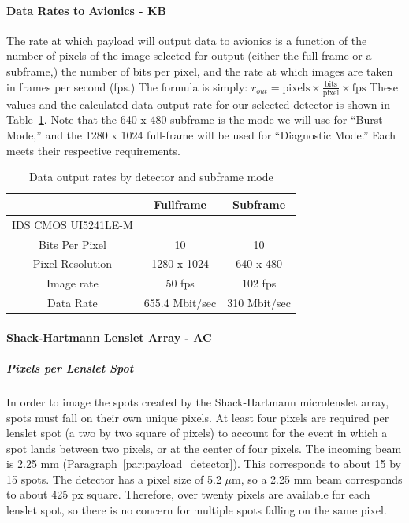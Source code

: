 \documentclass[12pt]{article}
\begin{document}
\paragraph{Data Rates to Avionics - KB}

The rate at which payload will output data to avionics is a function of the number of pixels of the image selected for output (either the full frame or a subframe,) the number of bits per pixel, and the rate at which images are taken in frames per second (fps.) The formula is simply: $r_{out} = \text{pixels} \times \frac{\text{bits}}{\text{pixel}} \times \text{fps}$
These values and the calculated data output rate for our selected detector is shown in Table~\ref{table:payload-data-rates}. Note that the 640 x 480 subframe is the mode we will use for ``Burst Mode,'' and the 1280 x 1024 full-frame will be used for ``Diagnostic Mode.'' Each meets their respective requirements. 

\begin{table}
\begin{center}
\caption{Data output rates by detector and subframe mode}
\begin{tabular}{|c||c|c|} 
\hline
& Fullframe & Subframe \\
\hline
IDS CMOS UI5241LE-M  &  &   \\
\hline
Bits Per Pixel &  10 & 10\\
Pixel Resolution  & 1280 x 1024 & 640 x 480 \\
Image rate &  50 fps & 102 fps\\
Data Rate & 655.4 Mbit/sec & 310 Mbit/sec \\
\hline
\end{tabular}\label{table:payload-data-rates}
\end{center}
\end{table}

\paragraph{Shack-Hartmann Lenslet Array - AC}
			
\subparagraph{Pixels per Lenslet Spot}\label{sec:payload_pixels}
In order to image the spots created by the Shack-Hartmann microlenslet array, spots must fall on their own unique pixels.  At least four pixels are required per lenslet spot (a two by two square of pixels) to account for the event in which a spot lands between two pixels, or at the center of four pixels.
The incoming beam is 2.25 mm (Paragraph~\ref{par:payload_detector}).  This corresponds to about 15 by 15 spots. The detector has a pixel size of 5.2 $\mu$m, so a 2.25 mm beam corresponds to about 425 px square.  Therefore, over twenty pixels are available for each lenslet spot, so there is no concern for multiple spots falling on the same pixel. 
				
\end{document}
